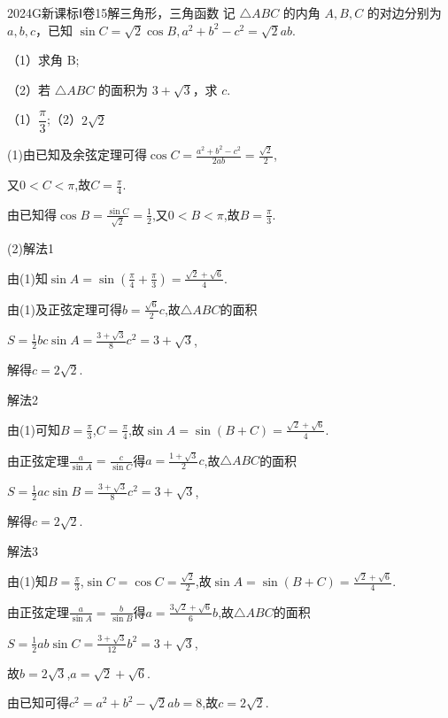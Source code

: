 \documentclass[12pt,UTF-8,a4paper]{ctexart}
\numberwithin{figure}{section}
\theoremstyle{mystyle}
\theoremstyle{mystylekaishu}
\theoremstyle{mystyle}
\numberwithin{xiti}{section}
\begin{document}
\begin{problem}{2024}{G}{新课标Ⅰ卷}{15}{解三角形，三角函数}
记 $\triangle ABC$ 的内角 $A,B,C$ 的对边分别为 $a,b,c$，已知 $\sin C=\sqrt{2}\cos B, a^2+b^2-c^2=\sqrt{2}ab$.

（1）求角 B;

（2）若 $\triangle ABC$ 的面积为 $3+\sqrt{3}$，求 $c$.
\end{problem}

\begin{answer}
（1）$\dfrac{\pi}{3}$;（2）$2\sqrt{2}$
\end{answer}

\begin{solutions}
(1)由已知及余弦定理可得$\cos C=\frac{a^{2}+b^{2}-c^{2}}{2ab}=\frac{\sqrt{2}}{2}$,

又$0<C<\pi$,故$C=\frac{\pi}{4}$.

由已知得$\cos B=\frac{\sin C}{\sqrt{2}}=\frac{1}{2}$,又$0<B<\pi$,故$B=\frac{\pi}{3}$.

(2)解法1

由(1)知$\sin A=\sin\left(\frac{\pi}{4}+\frac{\pi}{3}\right)=\frac{\sqrt{2}+\sqrt{6}}{4}$.

由(1)及正弦定理可得$b=\frac{\sqrt{6}}{2}c$,故$\triangle ABC$的面积

$S=\frac{1}{2}bc\sin A=\frac{3+\sqrt{3}}{8}c^{2}=3+\sqrt{3}$,

解得$c=2\sqrt{2}$.

解法2

由(1)可知$B=\frac{\pi}{3}$,$C=\frac{\pi}{4}$,故$\sin A=\sin(B+C)=\frac{\sqrt{2}+\sqrt{6}}{4}$.

由正弦定理$\frac{a}{\sin A}=\frac{c}{\sin C}$得$a=\frac{1+\sqrt{3}}{2}c$,故$\triangle ABC$的面积

$S=\frac{1}{2}ac\sin B=\frac{3+\sqrt{3}}{8}c^{2}=3+\sqrt{3}$,

解得$c=2\sqrt{2}$.

解法3

由(1)知$B=\frac{\pi}{3}$,$\sin C=\cos C=\frac{\sqrt{2}}{2}$,故$\sin A=\sin(B+C)=\frac{\sqrt{2}+\sqrt{6}}{4}$.

由正弦定理$\frac{a}{\sin A}=\frac{b}{\sin B}$得$a=\frac{3\sqrt{2}+\sqrt{6}}{6}b$,故$\triangle ABC$的面积

$S=\frac{1}{2}ab\sin C=\frac{3+\sqrt{3}}{12}b^{2}=3+\sqrt{3}$,

故$b=2\sqrt{3}$,$a=\sqrt{2}+\sqrt{6}$.

由已知可得$c^{2}=a^{2}+b^{2}-\sqrt{2}ab=8$,故$c=2\sqrt{2}$.
\end{solutions}
\end{document}
